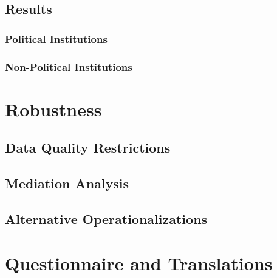 \documentclass[11pt, ngerman,english,a4]{article}
\begin{document}
\subsection{Results}

\subsubsection*{Political Institutions}





\newpage



\begin{landscape}

\subsubsection*{Non-Political Institutions}


\end{landscape}

\begin{landscape}


\end{landscape}

\normalsize

\newpage
\section*{Robustness}

\subsection*{Data Quality Restrictions}

\subsection*{Mediation Analysis}

\subsection*{Alternative Operationalizations}

\section*{Questionnaire and Translations}
\end{document}
